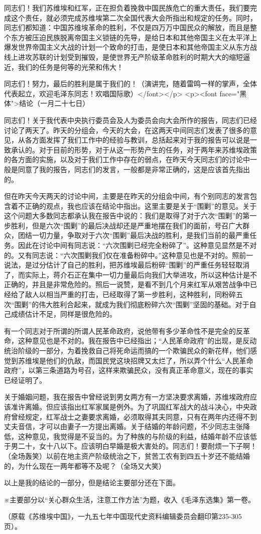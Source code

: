 同志们！我们苏维埃和红军，正在担负着挽救中国民族危亡的重大责任，我们要完成这个责任，就必须完成苏维埃第二次全国代表大会所指出和规定的任务。同时，同志们都知道：中国苏维埃革命的胜利，不仅是四万万中国民众的解放，而且是整个东方被压迫民族脱离帝国主义锁链的先导，是给日本和其他帝国主义在太平洋上爆发世界帝国主义大战的计划一个致命的打击，是使日本和其他帝国主义从东方战线上进攻苏联的计划受到摧毁，是使世界无产阶级革命胜利的时期大大的缩短逼近，我们的任务是何等的光荣和伟大！

同志们！努力，最后的胜利是属于我们的！（演讲完，随着雷鸣一样的掌声，全体代表起立，欢迎毛泽东同志！欢唱国际歌）</font></p>
<p><font face="黑体">结论（一月二十七日）

同志们！关于我代表中央执行委员会及人为委员会向大会所作的报告，同志们已经讨论了两天了。昨天的分组会，今天的大会，在这两天中间同志们发表了很多的意见，从各方面发挥了我们工作中的经验与教训，总括起来对于我的报告可以说是一致承认的。对于目前的形势，对于从这一形势产生的任务，对于两年来苏维埃政策的各方面的实施，以及对于我们工作中存在的弱点，在昨天今天同志们的讨论中一般是同意了我的报告，同志们的发言，一般都是非常正确的，这是应该首先指出的。

但在昨天今天两天的讨论中间，主要是在昨天的分组会中间，有个别同志的发言包含着不正确的观点，我也应该在结论中指出。这里主要是关于“围剿”的意见。关于这个问题大多数同志都承认我在报告中说的：我们是取得了对于六次“围剿”的第一步胜利，但是六次“围剿”的最后决战却还是严重地摆在我们的面前，号召广大群众，团结一切力量，争取对于六次“围剿”最后决战的胜利，是我们当前的最严重任务。因此在讨论中间有同志说：“六次围剿已经完全粉碎了”。这种意见显然是不对的。又有同志说：“六次围剿我们仅在准备粉碎中。”这种意见也是不对的。照前一说法，是过分估计了自己的胜利，把苏维埃最后粉碎“围剿”的严重任务轻轻取消了，而实际上，蒋介石正在集中一切力量最后向我们大举进攻，所以这种估计是不正确的，并且是非常危险的。照后一说赞，是看不到几个月来红军从艰苦战争中已经给了敌人以相当严重的打击，已经取得了第一步胜利，这种胜利，同粉碎五次“围剿”的伟大胜利合起来，就成为我们彻底粉碎六次“围剿”坚固的基础。对于自己成绩估计不足，同样是很危险的。

有一个同志对于所谓的所谓人民革命政府，说他带有多少革命性不是完全的反革命，这种意见也是不对的。我在报告中已经指出；“人民革命政府”的出现，是反动统治阶级的一部分，为着挽救自己将死命运而搞的一个欺骗民众的新花样，他们感觉到苏维埃是他们的仇敌，而国民党这块招牌又太烂了，所以弄个什么“人民革命政府”，以第三条道路为号召，这样来欺骗民众，没有真正革命意义，现在的事实已经证明了。

关于婚姻问题，我在报告中曾经说到男女两方有一方坚决要求离婚，苏维埃政府应该准许离婚。但应该指出红军家属是例外。为了巩固红军战大的战斗决心，中央政府曾经规定，红军战士之妻要求离婚，必须取得其夫同意，只有在两年内还得不到丈夫音信，才可以由妻子一方提出离婚。关于结婚的年龄问题，不少同志主张降低，这种意见，我觉得是不妥当的。为了种族的与阶级的利益，结婚年龄不应该低于男二十，女十八以下。应该明白早婚是极大害处的。同志们！要耐烦一下子啊！（全场轰笑）以前在地主资产阶级统治之下，贫苦工农有到四五十岁还不能结婚的，为什么现在一两年都等不及呢？（全场又大笑）

以上是我的结论的一部分，但是结论主要部分还在下面。

※主要部分以“关心群众生活，注意工作方法”为题，收入《毛泽东选集》第一卷。

（原载《苏维埃中国》，一九五七年中国现代史资料编辑委员会翻印第235-305页）。

